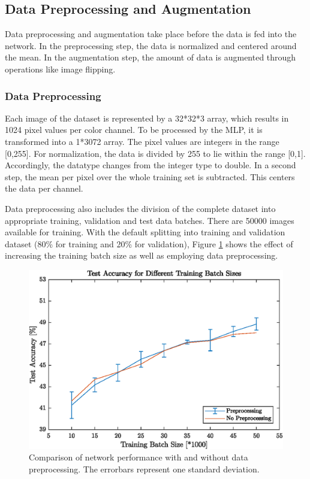 \FloatBarrier
\subsection{Data Preprocessing and Augmentation}\label{subsec:preProp}

Data preprocessing and augmentation take place before the data is fed into the network. In the preprocessing step, the data is normalized and centered around the mean. In the augmentation step, the amount of data is augmented through operations like image flipping.

\subsubsection{Data Preprocessing}\label{subsub:dataPreProp}

  	Each image of the dataset is represented by a 32*32*3 array, which results in 1024 pixel values per color channel. To be processed by the MLP, it is transformed into a 1*3072 array. The pixel values are integers in the range [0,255]. For normalization, the data is divided by 255 to lie within the range [0,1]. Accordingly, the datatype changes from the integer type to double. In a second step, the mean per pixel over the whole training set is subtracted. This centers the data per channel.

  	Data preprocessing also includes the division of the complete dataset into appropriate training, validation and test data batches. There are 50000 images available for training. With the default splitting into training and validation dataset (80\% for training and 20\% for validation), Figure \ref{fig:dataPreprocessing} shows the effect of increasing the training batch size as well as employing data preprocessing.

  	\begin{figure}[h!]
  		\centering
   		\includegraphics{images/dataPreprocessing}
   		\caption{Comparison of network performance with and without data preprocessing. The errorbars represent one standard deviation.}
   		\label{fig:dataPreprocessing}
   	\end{figure}


